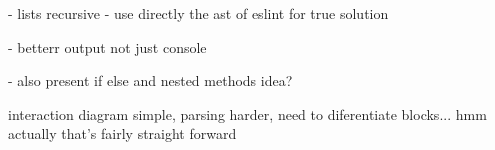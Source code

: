 - lists recursive
- use directly the ast of eslint for true solution

- betterr output not just console


- also present if else and nested methods idea? 

interaction diagram simple, parsing harder, need to diferentiate blocks... hmm actually that's fairly straight forward


